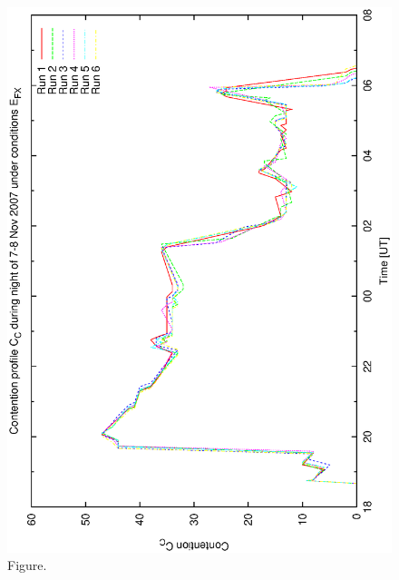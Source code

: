 \documentclass[12pt,a4paper]{article}
\begin{document}
\begin{figure}[htbp]
 \begin{center}
  \includegraphics[scale=1.0, angle=0]{figures/bsb_ex_cont.eps}
 \end{center}
  \caption[Figure.]
{Figure.}
\end{figure}
\clearpage
\end{document}
